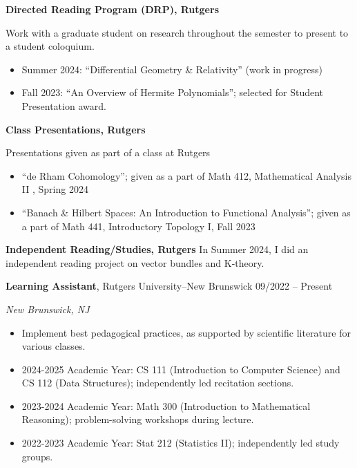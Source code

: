\documentclass{article}
\begin{document}
		\noindent \textbf{Directed Reading Program (DRP), Rutgers} \par 
		\noindent Work with a graduate student on research throughout the semester to present to a student coloquium. 
		\begin{itemize}[noitemsep]
				\item Summer 2024: ``Differential Geometry \& Relativity'' (work in progress) 
				\item Fall 2023: ``An Overview of Hermite Polynomials''; selected for Student Presentation award.
		\end{itemize}
		\noindent \textbf{Class Presentations, Rutgers} \par 
		\noindent Presentations given as part of a class at Rutgers 
		\begin{itemize}[noitemsep]
				\item ``de Rham Cohomology''; given as a part of Math 412, Mathematical Analysis II , Spring 2024
				\item ``Banach \& Hilbert Spaces: An Introduction to Functional Analysis''; given as a part of Math 441, Introductory Topology I, Fall 2023
		\end{itemize}
		\noindent \textbf{Independent Reading/Studies, Rutgers}
		\noindent In Summer 2024, I did an independent reading project on vector bundles and K-theory.
		\vspace{1.0em}

		\noindent \textbf{Learning Assistant}, Rutgers University--New Brunswick \hfill 09/2022 -- Present \par 
		\noindent \textit{New Brunswick, NJ} 
		\begin{itemize}[noitemsep, nolistsep]
				\item Implement best pedagogical practices, as supported by scientific literature for various classes. 
				\item 2024-2025 Academic Year: CS 111 (Introduction to Computer Science) and CS 112 (Data Structures); independently led recitation sections. 
				\item 2023-2024 Academic Year: Math 300 (Introduction to Mathematical Reasoning); problem-solving workshops during lecture.
				\item 2022-2023 Academic Year: Stat 212 (Statistics II); independently led study groups.
		\end{itemize}
		\vspace{1.0em}
\end{document}
